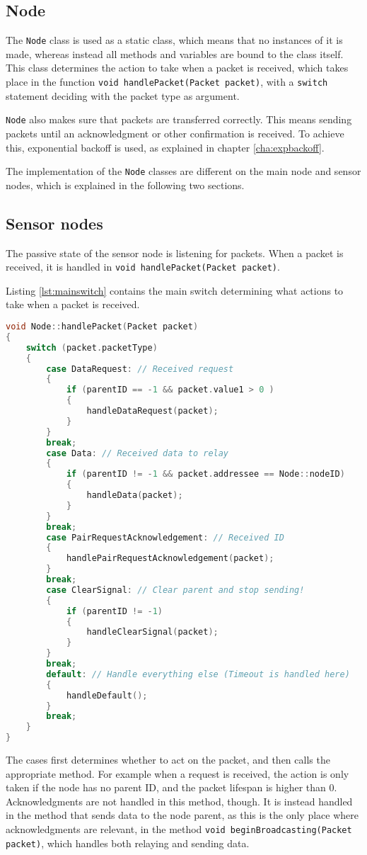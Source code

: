 \subsection{Node}
The \texttt{Node} class is used as a static class, which means that no instances of it is made, whereas instead all methods and variables are bound to the class itself. This class determines the action to take when a packet is received, which takes place in the function \texttt{void handlePacket(Packet packet)}, with a \texttt{switch} statement deciding with the packet type as argument.

\texttt{Node} also makes sure that packets are transferred correctly. This means sending packets until an acknowledgment or other confirmation is received. To achieve this, exponential backoff is used, as explained in chapter \ref{cha:expbackoff}.

The implementation of the \texttt{Node} classes are different on the main node and sensor nodes, which is explained in the following two sections.

\subsection{Sensor nodes} 
The passive state of the sensor node is listening for packets. When a packet is received, it is handled in \texttt{void handlePacket(Packet packet)}.  

Listing \ref{lst:mainswitch} contains the main switch determining what actions to take when a packet is received. 
\begin{lstlisting}[language=C,caption={The packet handling method.},label={lst:mainswitch}]
void Node::handlePacket(Packet packet)
{
    switch (packet.packetType)
    {
        case DataRequest: // Received request
        {
            if (parentID == -1 && packet.value1 > 0 )
            {
                handleDataRequest(packet);
            }
        }
        break;
        case Data: // Received data to relay
        {
            if (parentID != -1 && packet.addressee == Node::nodeID)
            {
                handleData(packet);
            }
        }
        break;
        case PairRequestAcknowledgement: // Received ID
        {
            handlePairRequestAcknowledgement(packet);
        }
        break;
        case ClearSignal: // Clear parent and stop sending!
        {
            if (parentID != -1)
            {
                handleClearSignal(packet);
            }
        }
        break;
        default: // Handle everything else (Timeout is handled here)
        {
            handleDefault();
        }
        break;
    }
}
\end{lstlisting}
The cases first determines whether to act on the packet, and then calls the appropriate method. For example when a request is received, the action is only taken if the node has no parent ID, and the packet lifespan is higher than 0. Acknowledgments are not handled in this method, though. It is instead handled in the method that sends data to the node parent, as this is the only place where acknowledgments are relevant, in the method \texttt{void beginBroadcasting(Packet packet)}, which handles both relaying and sending data.


